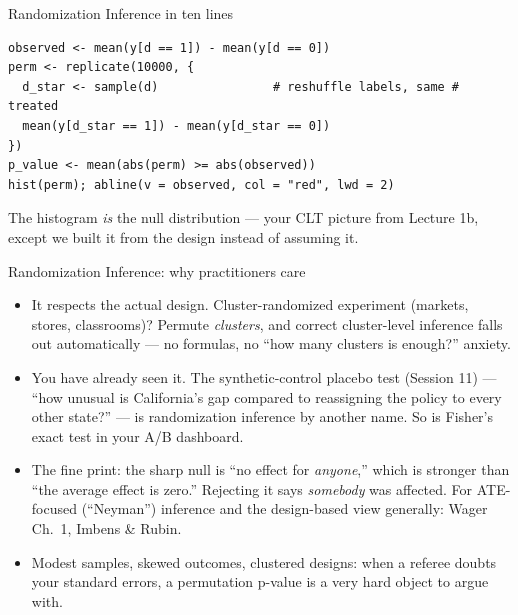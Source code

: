 \documentclass[aspectratio=169,11pt]{beamer}
\begin{document}
\begin{frame}[fragile]{Randomization Inference in ten lines}
\begin{lstlisting}
observed <- mean(y[d == 1]) - mean(y[d == 0])
perm <- replicate(10000, {
  d_star <- sample(d)                # reshuffle labels, same # treated
  mean(y[d_star == 1]) - mean(y[d_star == 0])
})
p_value <- mean(abs(perm) >= abs(observed))
hist(perm); abline(v = observed, col = "red", lwd = 2)
\end{lstlisting}
\medskip
The histogram \emph{is} the null distribution --- your CLT picture from Lecture 1b,
except we built it from the design instead of assuming it.
\end{frame}


\begin{frame}{Randomization Inference: why practitioners care}
\begin{itemize}
	\item \alert{It respects the actual design.} Cluster-randomized experiment
	(markets, stores, classrooms)? Permute \emph{clusters}, and correct
	cluster-level inference falls out automatically --- no formulas, no ``how many
	clusters is enough?'' anxiety.

	\medskip
	\item \alert{You have already seen it.} The synthetic-control placebo test
	(Session 11) --- ``how unusual is California's gap compared to reassigning the
	policy to every other state?'' --- is randomization inference by another name.
	So is Fisher's exact test in your A/B dashboard.

	\medskip
	\item \alert{The fine print:} the sharp null is ``no effect for \emph{anyone},''
	which is stronger than ``the average effect is zero.'' Rejecting it says
	\emph{somebody} was affected. For ATE-focused (``Neyman'') inference and the
	design-based view generally: Wager Ch.~1, Imbens \& Rubin.

	\medskip
	\item Modest samples, skewed outcomes, clustered designs: when a referee doubts
	your standard errors, a permutation p-value is a very hard object to argue with.
\end{itemize}
\end{frame}
\end{document}
